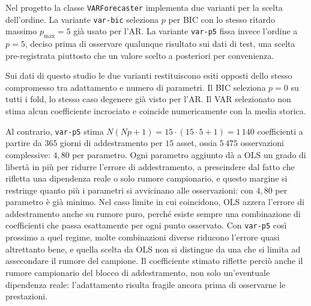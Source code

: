 Nel progetto la classe \texttt{VARForecaster} implementa due varianti per la scelta dell'ordine. La variante \texttt{var-bic} seleziona $p$ per BIC con lo stesso ritardo massimo $p_{\max}=5$ già usato per l'AR. La variante \texttt{var-p5} fissa invece l'ordine a $p=5$, deciso prima di osservare qualunque risultato sui dati di test, una scelta pre-registrata piuttosto che un valore scelto a posteriori per convenienza.

Sui dati di questo studio le due varianti restituiscono esiti opposti dello stesso compromesso tra adattamento e numero di parametri. Il BIC seleziona $p=0$ su tutti i fold, lo stesso caso degenere già visto per l'AR. Il VAR selezionato non stima alcun coefficiente incrociato e coincide numericamente con la media storica.

Al contrario, \texttt{var-p5} stima $N(Np+1)=15\cdot(15\cdot5+1)=1\,140$ coefficienti a partire da $365$ giorni di addestramento per $15$ asset, ossia $5\,475$ osservazioni complessive: $4{,}80$ per parametro. Ogni parametro aggiunto dà a OLS un grado di libertà in più per ridurre l'errore di addestramento, a prescindere dal fatto che rifletta una dipendenza reale o solo rumore campionario, e questo margine si restringe quanto più i parametri si avvicinano alle osservazioni: con $4{,}80$ per parametro è già minimo. Nel caso limite in cui coincidono, OLS azzera l'errore di addestramento anche su rumore puro, perché esiste sempre una combinazione di coefficienti che passa esattamente per ogni punto osservato. Con \texttt{var-p5} così prossimo a quel regime, molte combinazioni diverse riducono l'errore quasi altrettanto bene, e quella scelta da OLS non si distingue da una che si limita ad assecondare il rumore del campione. Il coefficiente stimato riflette perciò anche il rumore campionario del blocco di addestramento, non solo un'eventuale dipendenza reale: l'adattamento risulta fragile ancora prima di osservarne le prestazioni.
